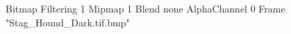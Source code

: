 {Bitmap
	{Filtering 1}
	{Mipmap 1}
	{Blend none}
	{AlphaChannel 0}
	{Frame "Stag_Hound_Dark.tif.bmp"}
}
